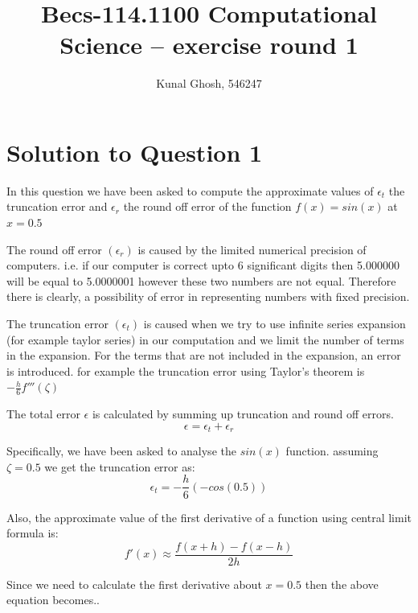 \documentclass[a4paper,11pt]{article}
\begin{document}
\title{Becs-114.1100 Computational Science -- exercise round 1} %
\author{Kunal Ghosh, 546247} %
\maketitle

\section{Solution to Question 1}\label{prob1}

In this question we have been asked to compute the approximate values of $\epsilon_t$ the truncation error and $\epsilon_r$ the round off error of the function $f(x) = sin(x)$ at $x=0.5$

The round off error $(\epsilon_r)$ is caused by the limited numerical precision of computers. i.e. if our computer is correct upto 6 significant digits then 5.000000 will be equal to 5.0000001 however these two numbers are not equal. Therefore there is clearly, a possibility of error in representing numbers with fixed precision.

The truncation error $(\epsilon_t)$ is caused when we try to use infinite series expansion (for example taylor series) in our computation and we limit the number of terms in the expansion. For the terms that are not included in the expansion, an error is introduced. for example the truncation error using Taylor's theorem is $-\frac{h}{6}f'''(\zeta)$

The total error $\epsilon$ is calculated by summing up truncation and round off errors.
\begin{equation}
\epsilon = \epsilon_t + \epsilon_r
\end{equation}

Specifically, we have been asked to analyse the $sin(x)$ function. assuming $\zeta = 0.5$ we get the truncation error as:
\begin{equation}
\epsilon_t = -\frac{h}{6}(-cos(0.5))
\label{eqn:et}
\end{equation}

Also, the approximate value of the first derivative of a function using central limit formula is:
\begin{equation}
f'(x) \approx \frac{f(x+h) - f(x-h)}{2h}
\end{equation}

Since we need to calculate the first derivative about $ x = 0.5 $ then the above equation becomes..
\end{document}
